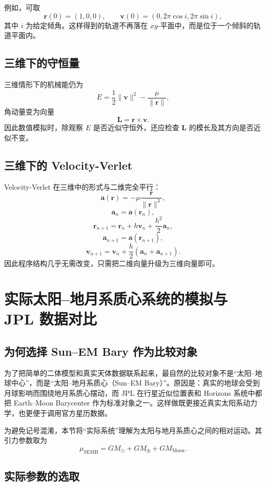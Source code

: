 \documentclass[12pt,a4paper]{ctexrep}
\begin{document}
例如，可取
\[
\bm r(0)=(1,0,0),
\qquad
\bm v(0)=\left(0,2\pi\cos i,2\pi\sin i\right),
\]
其中 \(i\) 为给定倾角。这样得到的轨道不再落在 \(xy\)-平面中，而是位于一个倾斜的轨道平面内。

\subsection{三维下的守恒量}

三维情形下的机械能仍为
\[
E=\frac12\|\bm v\|^2-\frac{\mu}{\|\bm r\|},
\]
角动量变为向量
\[
\bm L=\bm r\times \bm v.
\]
因此数值模拟时，除观察 \(E\) 是否近似守恒外，还应检查 \(\bm L\) 的模长及其方向是否近似不变。

\subsection{三维下的 Velocity-Verlet}

Velocity-Verlet 在三维中的形式与二维完全平行：
\[
\bm a(\bm r)=-\mu \frac{\bm r}{\|\bm r\|^3},
\]
\[
\bm a_n=\bm a(\bm r_n),
\]
\[
\bm r_{n+1}=\bm r_n+h\bm v_n+\frac{h^2}{2}\bm a_n,
\]
\[
\bm a_{n+1}=\bm a(\bm r_{n+1}),
\]
\[
\bm v_{n+1}=\bm v_n+\frac{h}{2}(\bm a_n+\bm a_{n+1}).
\]
因此程序结构几乎无需改变，只需把二维向量升级为三维向量即可。

\section{实际太阳--地月系质心系统的模拟与 JPL 数据对比}

\subsection{为何选择 Sun--EM Bary 作为比较对象}

为了把简单的二体模型和真实天体数据联系起来，最自然的比较对象不是“太阳--地球中心”，而是“太阳--地月系质心（Sun--EM Bary）”。原因是：真实的地球会受到月球影响而围绕地月系质心摆动，而 JPL 在行星近似位置表和 Horizons 系统中都把 Earth--Moon Barycenter 作为标准对象之一。这样做既更接近真实太阳系动力学，也更便于调用官方星历数据。

为避免记号混淆，本节将“实际系统”理解为太阳与地月系质心之间的相对运动。其引力参数取为
\[
\mu_{\mathrm{SEMB}}=GM_{\odot}+GM_{\oplus}+GM_{\mathrm{Moon}}.
\]

\subsection{实际参数的选取}
\end{document}

